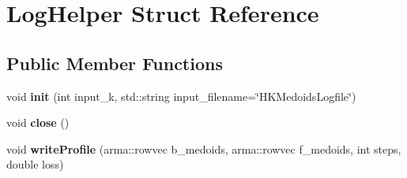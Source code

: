 \hypertarget{structLogHelper}{}\section{Log\+Helper Struct Reference}
\label{structLogHelper}
\subsection*{Public Member Functions}
\begin{DoxyCompactItemize}
\item 
\mbox{\label{structLogHelper_ab13e44f96df305a4022f0fab138d0412}} 
void {\bfseries init} (int input\+\_\+k, std\+::string input\+\_\+filename=\char`\"{}H\+K\+Medoids\+Logfile\char`\"{})
\item 
\mbox{\label{structLogHelper_a4624149f53c4577d0565f761c155d800}} 
void {\bfseries close} ()
\item 
\mbox{\label{structLogHelper_a15b3f49bf98956a0585f036801e25dbe}} 
void {\bfseries write\+Profile} (arma\+::rowvec b\+\_\+medoids, arma\+::rowvec f\+\_\+medoids, int steps, double loss)
\end{DoxyCompactItemize}
